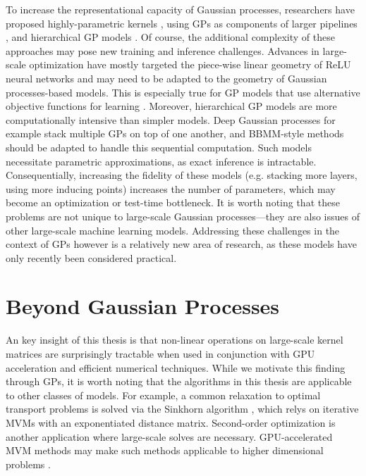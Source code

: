 To increase the representational capacity of Gaussian processes, researchers have proposed highly-parametric kernels \cite{wilson2013gaussian,wilson2016stochastic}, using GPs as components of larger pipelines \cite{schulam2015framework,futoma2017learning}, and hierarchical GP models \cite{wilson2012gaussian,salimbeni2017doubly,jankowiak2020deep}.
Of course, the additional complexity of these approaches may pose new training and inference challenges.
Advances in large-scale optimization have mostly targeted the piece-wise linear geometry of ReLU neural networks and may need to be adapted to the geometry of Gaussian processes-based models.
This is especially true for GP models that use alternative objective functions for learning \cite{sheth2017excess,knoblauch2019generalized,jankowiak2020parametric}.
Moreover, hierarchical GP models are more computationally intensive than simpler models.
Deep Gaussian processes for example stack multiple GPs on top of one another, and BBMM-style methods should be adapted to handle this sequential computation.
Such models necessitate parametric approximations, as exact inference is intractable.
Consequentially, increasing the fidelity of these models (e.g. stacking more layers, using more inducing points) increases the number of parameters, which may become an optimization or test-time bottleneck.
It is worth noting that these problems are not unique to large-scale Gaussian processes---they are also issues of other large-scale machine learning models.
Addressing these challenges in the context of GPs however is a relatively new area of research, as these models have only recently been considered practical.




\section{Beyond Gaussian Processes}

An key insight of this thesis is that non-linear operations on large-scale kernel matrices are surprisingly tractable when used in conjunction with GPU acceleration and efficient numerical techniques.
While we motivate this finding through GPs, it is worth noting that the algorithms in this thesis are applicable to other classes of models.
For example, a common relaxation to optimal transport problems is solved via the Sinkhorn algorithm \cite{cuturi2013sinkhorn}, which relys on iterative MVMs with an exponentiated distance matrix.
Second-order optimization is another application where large-scale solves are necessary.
GPU-accelerated MVM methods may make such methods applicable to higher dimensional problems \cite{koh2017understanding}.


